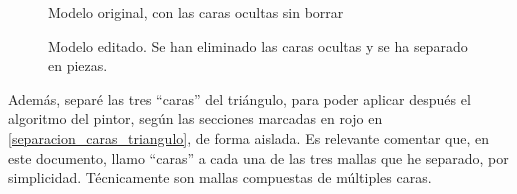 \documentclass[a4paper,12pt]{article}
\begin{document}
\begin{figure}[h]
    \centering
    \caption{Modelo original, con las caras ocultas sin borrar} \label{caras_ocultas_sin_borrar}
\end{figure}
\begin{figure}[h]
    \centering
    \caption{Modelo editado. Se han eliminado las caras ocultas y se ha separado en piezas.} \label{caras_ocultas_borradas}
\end{figure}

Además, separé las tres ``caras'' del triángulo, para poder aplicar después el algoritmo del pintor, según las secciones marcadas en rojo en \ref{separacion_caras_triangulo}, de forma aislada. Es relevante comentar que, en este documento, llamo ``caras'' a cada una de las tres mallas que he separado, por simplicidad. Técnicamente son mallas compuestas de múltiples caras.
\end{document}
